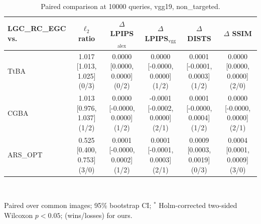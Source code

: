 \begin{table}[t]
\centering\footnotesize
\caption{Paired comparison at 10000 queries, vgg19, non\_targeted.}
\begin{tabular}{lccccc}
\toprule
LGC\_RC\_EGC vs. & $\ell_2$ ratio & $\Delta$ LPIPS$_{\mathrm{alex}}$ & $\Delta$ LPIPS$_{\mathrm{vgg}}$ & $\Delta$ DISTS & $\Delta$ SSIM \\
\midrule
TtBA & 1.017 [1.013, 1.025] (0/3) & 0.0000 [0.0000, 0.0000] (0/2) & 0.0000 [-0.0000, 0.0000] (1/2) & 0.0001 [-0.0001, 0.0003] (1/2) & 0.0000 [0.0000, 0.0000] (2/0) \\
CGBA & 1.013 [0.976, 1.037] (1/2) & 0.0000 [-0.0000, 0.0000] (1/2) & -0.0001 [-0.0002, 0.0000] (2/1) & 0.0001 [-0.0000, 0.0004] (1/2) & 0.0000 [-0.0000, 0.0000] (2/1) \\
ARS\_OPT & 0.525 [0.400, 0.753] (3/0) & 0.0001 [-0.0000, 0.0002] (1/2) & 0.0001 [-0.0001, 0.0003] (2/1) & 0.0009 [0.0003, 0.0019] (0/3) & 0.0004 [0.0001, 0.0009] (3/0) \\
\bottomrule
\end{tabular}
\\[2pt]\parbox{\linewidth}{\scriptsize Paired over common images; 95\% bootstrap CI; $^{*}$ Holm-corrected two-sided Wilcoxon $p<0.05$; (wins/losses) for ours.}
\end{table}
